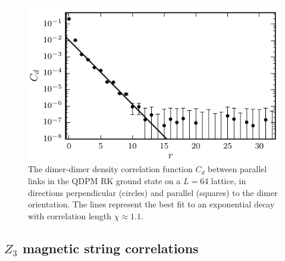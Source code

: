 \documentclass[twocolumn,prb,aps,floatfix,superscriptaddress]{revtex4-1}
\begin{document}
\begin{figure}
    \centering
    \includegraphics[width=1.0\columnwidth]{spatial_cors_parallel.pdf}
    \caption{The dimer-dimer density correlation function $C_d$ between parallel links in the QDPM RK ground state on a $L=64$ lattice, in directions perpendicular (circles) and parallel (squares) to the dimer orientation.  The lines represent the best fit to an exponential decay with correlation length $\chi\approx 1.1$.}
    \label{fig:spatial_dmr_cor}
\end{figure}

\subsection{$Z_3$ magnetic string correlations}
\end{document}
